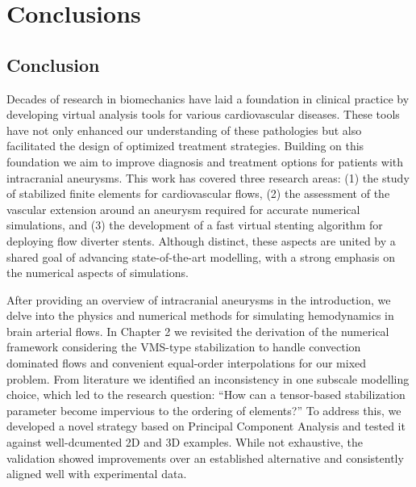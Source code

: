 \newpage
\pagestyle{fancy}

\chapter{Conclusions}\label{conclusion}
\minitoc
\newpage

\section{Conclusion}
Decades of research in biomechanics have laid a foundation in clinical practice by developing virtual analysis tools for various cardiovascular diseases. These tools have not only enhanced our understanding of these pathologies but also facilitated the design of optimized treatment strategies. Building on this foundation we aim to improve diagnosis and treatment options for patients with intracranial aneurysms. This work has covered three research areas: (1) the study of stabilized finite elements for cardiovascular flows, (2) the assessment of the vascular extension around an aneurysm required for accurate numerical simulations, and (3) the development of a fast virtual stenting algorithm for deploying flow diverter stents. Although distinct, these aspects are united by a shared goal of advancing state-of-the-art modelling, with a strong emphasis on the numerical aspects of simulations.

After providing an overview of intracranial aneurysms in the introduction, we delve into the physics and numerical methods for simulating hemodynamics in brain arterial flows. In Chapter 2 we revisited the derivation of the numerical framework considering the VMS-type stabilization to handle convection dominated flows and convenient equal-order interpolations for our mixed problem. From literature we identified an inconsistency in one subscale modelling choice, which led to the research question: ``How can a tensor-based stabilization parameter become impervious to the ordering of elements?'' To address this, we developed a novel strategy based on Principal Component Analysis and tested it against well-dcumented 2D and 3D examples. While not exhaustive, the validation showed improvements over an established alternative and consistently aligned well with experimental data.

